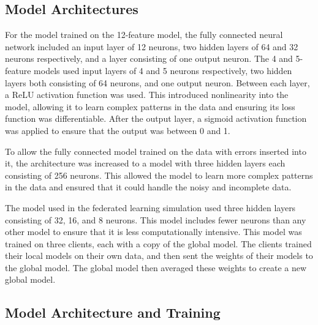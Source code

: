 \documentclass[conference]{IEEEtran}
\begin{document}
\subsection{Model Architectures}
For the model trained on the 12-feature model, the fully
connected neural network included an input layer of 12
neurons, two hidden layers of 64 and 32 neurons
respectively, and a layer consisting of one output neuron.
The 4 and 5-feature models used input layers of 4 and 5
neurons respectively, two hidden layers both consisting of
64 neurons, and one output neuron. Between each layer, a
ReLU activation function was used. This introduced
nonlinearity into the model, allowing it to learn complex
patterns in the data and ensuring its loss function was
differentiable. After the output layer, a sigmoid activation
function was applied to ensure that the output was between 0
and 1.

To allow the fully connected model trained on the data with
errors inserted into it, the architecture was increased to a
model with three hidden layers each consisting of 256
neurons. This allowed the model to learn more complex
patterns in the data and ensured that it could handle the
noisy and incomplete data.

The model used in the federated learning simulation used
three hidden layers consisting of 32, 16, and 8 neurons.
This model includes fewer neurons than any other model to
ensure that it is less computationally intensive. This model
was trained on three clients, each with a copy of the global
model. The clients trained their local models on their own
data, and then sent the weights of their models to the
global model. The global model then averaged these weights
to create a new global model.



\subsection{Model Architecture and Training}
\end{document}
